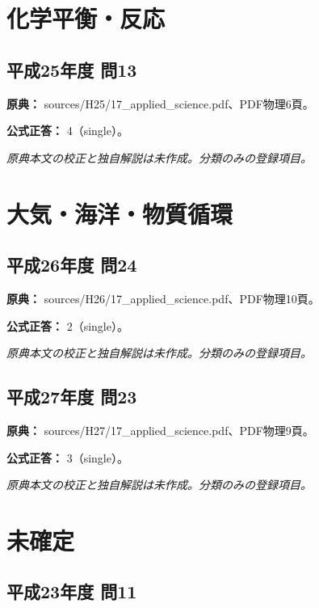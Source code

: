 \section{化学平衡・反応}

\subsection{平成25年度 問13}
\label{q:h25-reg-applied-13}

\noindent\textbf{原典：} sources/H25/17\_applied\_science.pdf、PDF物理6頁。

\textbf{公式正答：} 4（single）。

\par\textit{原典本文の校正と独自解説は未作成。分類のみの登録項目。}

\section{大気・海洋・物質循環}

\subsection{平成26年度 問24}
\label{q:h26-reg-applied-24}

\noindent\textbf{原典：} sources/H26/17\_applied\_science.pdf、PDF物理10頁。

\textbf{公式正答：} 2（single）。

\par\textit{原典本文の校正と独自解説は未作成。分類のみの登録項目。}

\subsection{平成27年度 問23}
\label{q:h27-reg-applied-23}

\noindent\textbf{原典：} sources/H27/17\_applied\_science.pdf、PDF物理9頁。

\textbf{公式正答：} 3（single）。

\par\textit{原典本文の校正と独自解説は未作成。分類のみの登録項目。}

\section{未確定}

\subsection{平成23年度 問11}
\label{q:h23-reg-applied-11}

